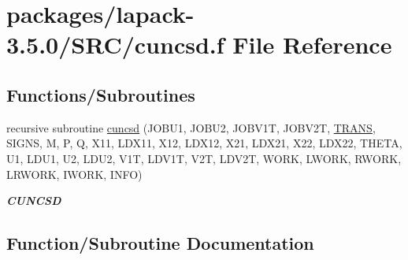 \hypertarget{cuncsd_8f}{}\section{packages/lapack-\/3.5.0/\+S\+R\+C/cuncsd.f File Reference}
\label{cuncsd_8f}
\subsection*{Functions/\+Subroutines}
\begin{DoxyCompactItemize}
\item 
recursive subroutine \hyperlink{cuncsd_8f_a55ab9c7b1a2bce552037cf519201e950}{cuncsd} (J\+O\+B\+U1, J\+O\+B\+U2, J\+O\+B\+V1\+T, J\+O\+B\+V2\+T, \hyperlink{superlu__enum__consts_8h_a0c4e17b2d5cea33f9991ccc6a6678d62a1f61e3015bfe0f0c2c3fda4c5a0cdf58}{T\+R\+A\+N\+S}, S\+I\+G\+N\+S, M, P, Q, X11, L\+D\+X11, X12, L\+D\+X12, X21, L\+D\+X21, X22, L\+D\+X22, T\+H\+E\+T\+A, U1, L\+D\+U1, U2, L\+D\+U2, V1\+T, L\+D\+V1\+T, V2\+T, L\+D\+V2\+T, W\+O\+R\+K, L\+W\+O\+R\+K, R\+W\+O\+R\+K, L\+R\+W\+O\+R\+K, I\+W\+O\+R\+K, I\+N\+F\+O)
\begin{DoxyCompactList}\small\item\em {\bfseries C\+U\+N\+C\+S\+D} \end{DoxyCompactList}\end{DoxyCompactItemize}


\subsection{Function/\+Subroutine Documentation}
\hypertarget{cuncsd_8f_a55ab9c7b1a2bce552037cf519201e950}{}
